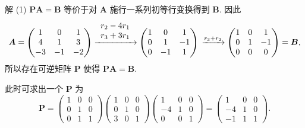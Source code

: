 \documentclass[../../main.tex]{subfiles}%
\begin{document}
\begin{solution}

解 (1) $\boldsymbol{PA} = \boldsymbol{B}$ 等价于对 $\boldsymbol{A}$ 施行一系列初等行变换得到 $\boldsymbol{B}$. 因此
\[
\boldsymbol{A} = \begin{pmatrix} 
1 & 0 & 1 \\
4 & 1 & 3 \\
-3 & -1 & -2 
\end{pmatrix} \xrightarrow{\begin{array}{c}
r_2-4r_1\\
r_3+3r_1\\
\end{array}}\begin{pmatrix} 
1 & 0 & 1 \\
0 & 1 & -1 \\
0 & -1 & 1 
\end{pmatrix} \\
\xrightarrow{r_3 + r_2} \begin{pmatrix} 
1 & 0 & 1 \\
0 & 1 & -1 \\
0 & 0 & 0 
\end{pmatrix} = \boldsymbol{B},
\]
所以存在可逆矩阵 $\boldsymbol{P}$ 使得 $\boldsymbol{PA} = \boldsymbol{B}$.

此时可求出一个 $\boldsymbol{P}$ 为
\[
\boldsymbol{P} = \begin{pmatrix} 
1 & 0 & 0 \\
0 & 1 & 0 \\
0 & 1 & 1 
\end{pmatrix} \begin{pmatrix} 
1 & 0 & 0 \\
0 & 1 & 0 \\
3 & 0 & 1 
\end{pmatrix} \begin{pmatrix} 
1 & 0 & 0 \\
-4 & 1 & 0 \\
0 & 0 & 1 
\end{pmatrix} = \begin{pmatrix} 
1 & 0 & 0 \\
-4 & 1 & 0 \\
-1 & 1 & 1 
\end{pmatrix}.
\]


\end{solution}
\end{document}
